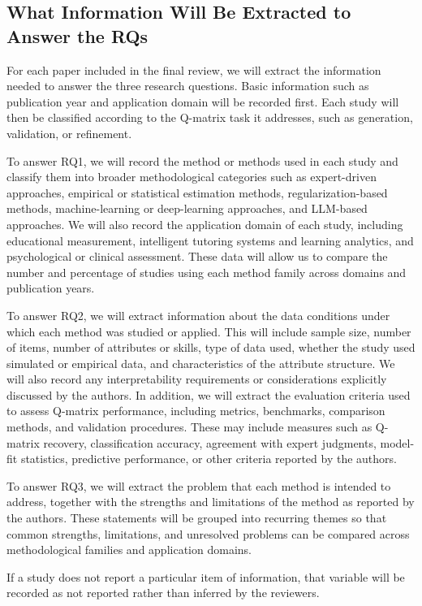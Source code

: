 \documentclass[sigconf,nonacm]{acmart}
\begin{document}
\subsection{What Information Will Be Extracted to Answer the RQs}

For each paper included in the final review, we will extract the information needed to answer the three research questions. Basic information such as publication year and application domain will be recorded first. Each study will then be classified according to the Q-matrix task it addresses, such as generation, validation, or refinement.

To answer RQ1, we will record the method or methods used in each study and classify them into broader methodological categories such as expert-driven approaches, empirical or statistical estimation methods, regularization-based methods, machine-learning or deep-learning approaches, and LLM-based approaches. We will also record the application domain of each study, including educational measurement, intelligent tutoring systems and learning analytics, and psychological or clinical assessment. These data will allow us to compare the number and percentage of studies using each method family across domains and publication years.

To answer RQ2, we will extract information about the data conditions under which each method was studied or applied. This will include sample size, number of items, number of attributes or skills, type of data used, whether the study used simulated or empirical data, and characteristics of the attribute structure. We will also record any interpretability requirements or considerations explicitly discussed by the authors. In addition, we will extract the evaluation criteria used to assess Q-matrix performance, including metrics, benchmarks, comparison methods, and validation procedures. These may include measures such as Q-matrix recovery, classification accuracy, agreement with expert judgments, model-fit statistics, predictive performance, or other criteria reported by the authors.

To answer RQ3, we will extract the problem that each method is intended to address, together with the strengths and limitations of the method as reported by the authors. These statements will be grouped into recurring themes so that common strengths, limitations, and unresolved problems can be compared across methodological families and application domains.

If a study does not report a particular item of information, that variable will be recorded as not reported rather than inferred by the reviewers.
\end{document}
